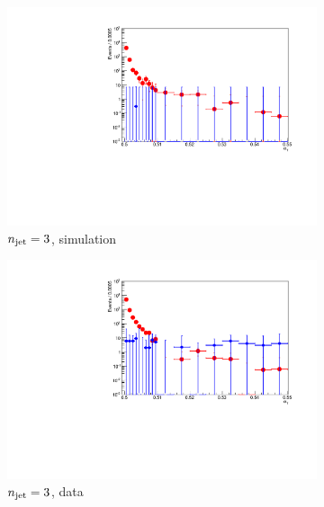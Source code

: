 \begin{figure}[h!]
  \centering
  \begin{subfigure}[b]{0.46\textwidth}
    \includegraphics[width=\textwidth]{Figs/dphi/chris2/qcd_mc/dphi_incl/v2/dphi_eq3j_ge0b_775}
    \caption{$n_{\text{jet}} = 3$, simulation}
    \label{fig:dphi_acceptance_sim_3j}
  \end{subfigure}
  \begin{subfigure}[b]{0.46\textwidth}
    \includegraphics[width=\textwidth]{Figs/dphi/chris2/data/dphi_incl/v2/dphi_eq3j_ge0b_775}
    \caption{$n_{\text{jet}} = 3$, data}
    \label{fig:dphi_acceptance_data_3j}
  \end{subfigure}\\
  \begin{subfigure}[b]{0.46\textwidth}

\end{subfigure}
\end{figure}
